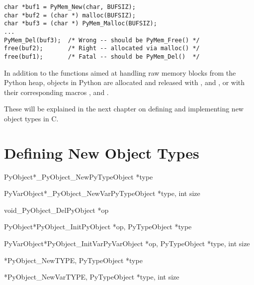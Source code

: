 \documentclass{manual}
\begin{document}
\begin{verbatim}
char *buf1 = PyMem_New(char, BUFSIZ);
char *buf2 = (char *) malloc(BUFSIZ);
char *buf3 = (char *) PyMem_Malloc(BUFSIZ);
...
PyMem_Del(buf3);  /* Wrong -- should be PyMem_Free() */
free(buf2);       /* Right -- allocated via malloc() */
free(buf1);       /* Fatal -- should be PyMem_Del()  */
\end{verbatim}

In addition to the functions aimed at handling raw memory blocks from
the Python heap, objects in Python are allocated and released with
,  and
, or with their corresponding macros
,  and
.

These will be explained in the next chapter on defining and
implementing new object types in C.


\chapter{Defining New Object Types \label{newTypes}}

\begin{cfuncdesc}{PyObject*}{_PyObject_New}{PyTypeObject *type}
\end{cfuncdesc}

\begin{cfuncdesc}{PyVarObject*}{_PyObject_NewVar}{PyTypeObject *type, int size}
\end{cfuncdesc}

\begin{cfuncdesc}{void}{_PyObject_Del}{PyObject *op}
\end{cfuncdesc}

\begin{cfuncdesc}{PyObject*}{PyObject_Init}{PyObject *op,
						PyTypeObject *type}
\end{cfuncdesc}

\begin{cfuncdesc}{PyVarObject*}{PyObject_InitVar}{PyVarObject *op,
						PyTypeObject *type, int size}
\end{cfuncdesc}

\begin{cfuncdesc}{*}{PyObject_New}{TYPE, PyTypeObject *type}
\end{cfuncdesc}

\begin{cfuncdesc}{*}{PyObject_NewVar}{TYPE, PyTypeObject *type,
                                                int size}
\end{cfuncdesc}
\end{document}
